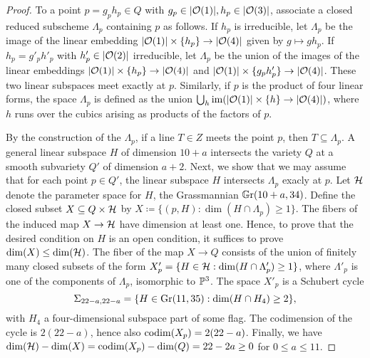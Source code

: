 \begin{proof}
	To a point $p = g_p h_p \in Q$ with $g_p \in \lvert\mathcal{O}(1)\rvert, h_p \in \lvert\mathcal{O}(3)\rvert$, associate a closed reduced subscheme $\Lambda_p$ containing $p$ as follows. If $h_p$ is irreducible, let $\Lambda_p$ be the image of the linear embedding $\lvert\mathcal{O}(1)\rvert\times \{h_p\} \to \lvert\mathcal{O}(4)\rvert$ given by $g \mapsto g h_p$. If $h_p = g'_p h'_p$ with $h'_p \in \lvert\mathcal{O}(2)\rvert$ irreducible, let $\Lambda_p$ be the union of the images of the linear embeddings $\lvert\mathcal{O}(1)\rvert \times \{h_p\} \to \lvert\mathcal{O}(4)\rvert$ and $\lvert\mathcal{O}(1)\rvert \times \{g_p h'_p\} \to \lvert\mathcal{O}(4)\rvert$. These two linear subspaces meet exactly at $p$. Similarly, if $p$ is the product of four linear forms, the space $\Lambda_p$ is defined as the union $\bigcup_h \operatorname{im}(\lvert\mathcal{O}(1)\rvert \times \{h\}\to \lvert\mathcal{O}(4)\rvert)$, where $h$ runs over the cubics arising as products of the factors of $p$.

	By the construction of the $\Lambda_p$, if a line $T\in Z$ meets the point $p$, then $T\subseteq \Lambda_p$. A general linear subspace $H$ of dimension $10+a$ intersects the variety $Q$ at a smooth subvariety $Q'$ of dimension $a+2$. Next, we show that we may assume that for each point $p\in Q'$, the linear subspace $H$ intersects $\Lambda_p$ exacly at $p$. Let $\mathcal{H}$ denote the parameter space for $H$, \ie the Grassmannian $\mathbb G \mathrm r(10+a, 34)$. Define the closed subset $X\subseteq Q\times \mathcal{H}$ by
	$X\coloneqq \{(p,H):\dim(H\cap \Lambda_p)\geq 1\}$. The fibers of the induced map $X\to \mathcal{H}$ have dimension at least one. Hence, to prove that the desired condition on $H$ is an open condition, it suffices to prove $\dim(X) \leq \dim(\mathcal{H})$. The fiber of the map $X\to Q$ consists of the union of finitely many closed subsets of the form $X'_p = \{H\in \mathcal{H} : \dim(H\cap \Lambda'_p)\geq 1\}$, where $\Lambda'_p$ is one of the components of $\Lambda_p$, isomorphic to $\mathbb{P}^3$. The space $X'_p$ is a Schubert cycle
	\[
		\Sigma_{22-a,22-a} = \{H\in \operatorname{Gr}(11,35) : \dim(H \cap H_4) \geq 2\},
	\]
	with $H_4$ a four-dimensional subspace part of some flag. The codimension of the cycle is $2(22-a)$, hence also $\operatorname{codim}(X_p) = 2(22-a)$. Finally, we have $\dim(\mathcal{H})-\dim(X) = \operatorname{codim}(X_p) - \dim(Q) = 22-2a \geq 0$ for $0\leq a \leq 11$.
\end{proof}